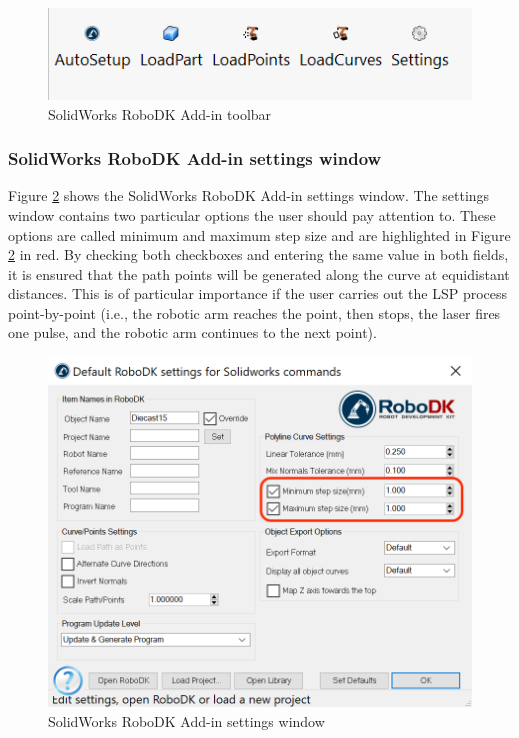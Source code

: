 \begin{figure}[h]
    \centering
    \includegraphics[width=0.6\linewidth]{img/solidworks_toolbar.PNG}
    \caption{SolidWorks RoboDK Add-in toolbar}
    \label{fig:solidworkstoolbar}
\end{figure}


\subsubsection*{SolidWorks RoboDK Add-in settings window}

Figure \ref{fig:solidworkssettings} shows the SolidWorks RoboDK Add-in settings window. The settings window contains two particular options the user should pay attention to. These options are called minimum and maximum step size and are highlighted in Figure \ref{fig:solidworkssettings} in red. By checking both checkboxes and entering the same value in both fields, it is ensured that the path points will be generated along the curve at equidistant distances. This is of particular importance if the user carries out the LSP process  point-by-point (i.e., the robotic arm reaches the point, then stops, the laser fires one pulse, and the robotic arm continues to the next point).


\begin{figure}[h]
    \centering
    \includegraphics[width=1.0\linewidth]{img/settings_add_in_v_2.png}
    \caption{SolidWorks RoboDK Add-in settings window}
    \label{fig:solidworkssettings}
\end{figure}






